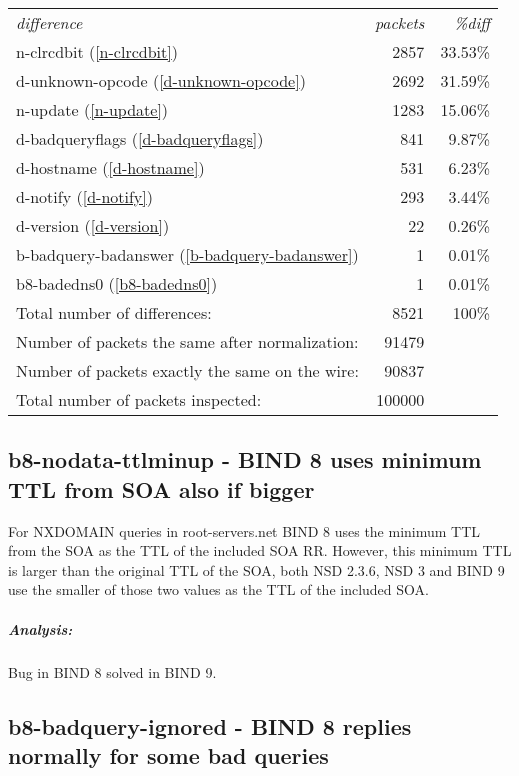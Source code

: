 \documentclass[twoside,titlepage,english]{nlnetlabs}
\begin{document}
\begin{tabular}{lrr}
{\em difference}			& {\em packets} & {\em \%diff}	\\
n-clrcdbit        (\ref{n-clrcdbit})         &           2857        &33.53\% \\
d-unknown-opcode  (\ref{d-unknown-opcode})   &           2692        &31.59\% \\
n-update          (\ref{n-update})           &           1283        &15.06\% \\
d-badqueryflags   (\ref{d-badqueryflags})    &            841        &9.87\% \\
d-hostname        (\ref{d-hostname})         &            531        &6.23\% \\
d-notify          (\ref{d-notify})           &            293        &3.44\% \\
d-version         (\ref{d-version})          &             22        &0.26\% \\
b-badquery-badanswer (\ref{b-badquery-badanswer}) &         1        &0.01\% \\
b8-badedns0          (\ref{b8-badedns0})     &              1        &0.01\% \\
Total number of differences: &8521 &100\% \\
Number of packets the same after normalization:&91479 \\
Number of packets exactly the same on the wire:&90837 \\
Total number of packets inspected:&100000 \\
\end{tabular}


\subsection{b8-nodata-ttlminup - BIND 8 uses minimum TTL from SOA also if bigger}
\label{b8-nodata-ttlminup}

For NXDOMAIN queries in root-servers.net BIND 8 uses the minimum TTL from
the SOA as the TTL of the included SOA RR. However, this minimum TTL is 
larger than the original TTL of the SOA, both NSD 2.3.6, NSD 3 and BIND 9
use the smaller of those two values as the TTL of the included SOA.

\vspace{-8pt}\subparagraph{Analysis:}

Bug in BIND 8 solved in BIND 9.


\subsection{b8-badquery-ignored - BIND 8 replies normally for some bad queries}
\label{b8-badquery-ignored}
\end{document}
